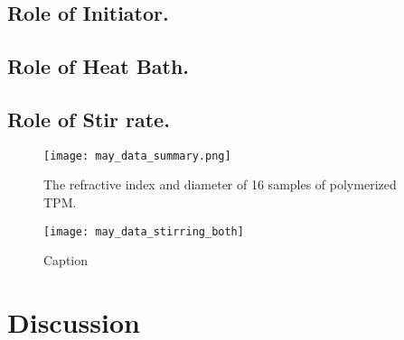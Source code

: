 \subsection{Role of Initiator.}

\subsection{Role of Heat Bath.}

\subsection{Role of Stir rate.}


\begin{figure}
    \centering
    \texttt{[image: may\_data\_summary.png]}
    \caption{The refractive index and diameter of 16 samples of 
    polymerized TPM.}
    \label{fig:initiator_data}
\end{figure}

\begin{figure}
    \centering
    \texttt{[image: may\_data\_stirring\_both]}
    \caption{Caption}
    \label{fig:stir_rate}
\end{figure}


\section{Discussion}
